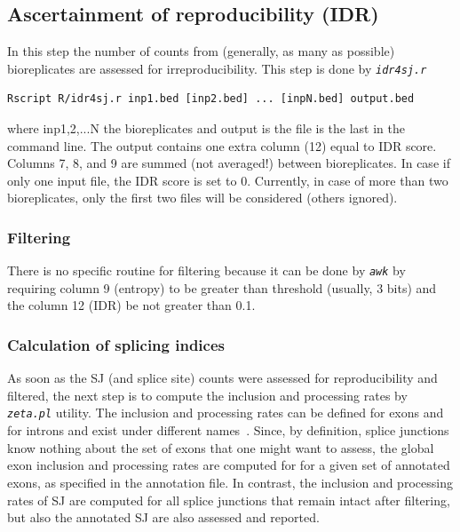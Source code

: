 \documentclass{article}
\newcommand{\prog}[1]{{\tt\em #1}}
\begin{document}
\subsection{Ascertainment of reproducibility (IDR)}
In this step the number of counts from (generally, as many as possible) bioreplicates are assessed for irreproducibility. This step is done by \prog{idr4sj.r}
\begin{verbatim}
Rscript R/idr4sj.r inp1.bed [inp2.bed] ... [inpN.bed] output.bed
\end{verbatim}
where inp1,2,...N the bioreplicates and output is the file is the last in the command line. The output contains one extra column (12) equal to IDR score.
Columns 7, 8, and 9 are summed (not averaged!) between bioreplicates. 
In case if only one input file, the IDR score is set to 0. Currently, in case of more than two bioreplicates, only the first two files will be considered (others ignored).


\subsubsection{Filtering}

There is no specific routine for filtering because it can be done by \prog{awk} by requiring column 9 (entropy)
to be greater than threshold (usually, 3 bits) and the column 12 (IDR) be not greater than 0.1.


\subsubsection{Calculation of splicing indices}
As soon as the SJ (and splice site) counts were assessed for reproducibility and filtered, the next step is to compute the inclusion and processing rates by \prog{zeta.pl} utility.
The inclusion and processing rates can be defined for exons and for introns and exist under different names~\cite{pmid23172860}. Since, by definition, splice junctions 
know nothing about the set of exons that one might want to assess, the  global exon inclusion and processing rates are computed for for a given set of 
annotated exons, as specified in the annotation file. In contrast, the inclusion and processing rates of SJ are computed for all splice junctions that remain
intact after filtering, but also the annotated SJ are also assessed and reported.
\end{document}

